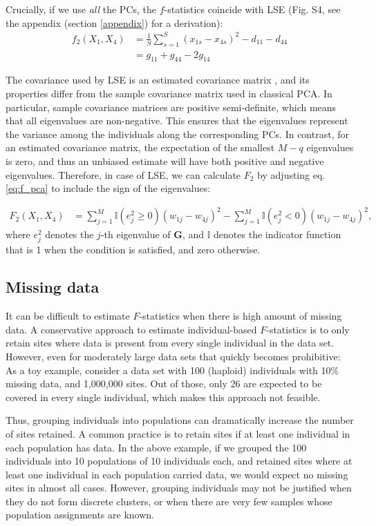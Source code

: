 \documentclass[12pt]{article}
\begin{document}
Crucially, if we use \emph{all} the PCs, the $f$-statistics coincide with LSE (Fig. S4, see the appendix (section \ref{appendix}) for a derivation): 
\begin{align}
    f_2(X_1, X_4) &= \frac{1}{S} \sum_{s=1}^S (x_{1s} - x_{4s})^2 - d_{11} - d_{44} \nonumber\\
    &= g_{11} + g_{44} - 2 g_{14} \label{eq:lse}
\end{align}

The covariance used by LSE is an estimated covariance matrix \citep{van_waaij_evaluation_2023}, and its properties differ from the sample covariance matrix used in classical PCA. In particular, sample covariance matrices are positive semi-definite, which means that all eigenvalues are non-negative. This ensures that the eigenvalues represent the variance among the individuals along the corresponding PCs. In contrast, for an estimated covariance matrix, the expectation of the smallest $M-q$ eigenvalues is zero, and thus an unbiased estimate will have both positive and negative eigenvalues. Therefore, in case of LSE, we can calculate $F_2$ by adjusting eq. \ref{eq:f_pca} to include the sign of the eigenvalues:


\begin{align}\label{eq:f_lse}
F_2(X_1,X_4) &= \sum_{j=1}^{M}\mathbb{I}(e_j^2 \geq 0) (w_{1j} - w_{4j})^2 - \sum_{j=1}^M \mathbb{I}(e_j^2 <0) (w_{1j} - w_{4j})^2,
\end{align}
where $e_j^2$ denotes the $j$-th eigenvalue of $\mathbf{G}$, and $\mathbb{I}$ denotes the indicator function that is 1 when the condition is satisfied, and zero otherwise.


\subsection{Missing data}
It can be difficult to estimate $F$-statistics when there is high amount of missing data. A conservative approach to estimate individual-based $F$-statistics is to only retain sites where data is present from every single individual in the data set. However, even for moderately large data sets that quickly becomes prohibitive: As a toy example, consider a data set with 100 (haploid) individuals with 10\% missing data, and 1,000,000 sites. Out of those, only 26 are expected to be covered in every single individual, which makes this approach not feasible.

Thus, grouping individuals into populations can dramatically increase the number of sites retained. A common practice is to retain sites if at least one individual in each population has data. In the above example, if we grouped the 100 individuals into 10 populations of 10 individuals each, and retained sites where at least one individual in each population carried data, we would expect no missing sites in almost all cases. However, grouping individuals may not be justified when they do not form discrete clusters, or when there are very few samples whose population assignments are known.
\end{document}
